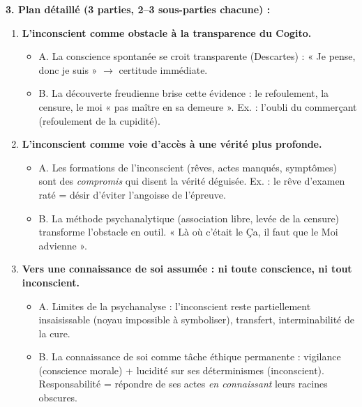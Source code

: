 \documentclass[11pt]{article}
\begin{document}
\begin{exoresolu}
\textbf{3. Plan détaillé (3 parties, 2--3 sous-parties chacune) :}
\begin{enumerate}
    \item \textbf{L'inconscient comme obstacle à la transparence du Cogito.}
    \begin{itemize}
        \item A. La conscience spontanée se croit transparente (Descartes) : « Je pense, donc je suis » $\to$ certitude immédiate.
        \item B. La découverte freudienne brise cette évidence : le refoulement, la censure, le moi « pas maître en sa demeure ». Ex. : l'oubli du commerçant (refoulement de la cupidité).
    \end{itemize}
    \item \textbf{L'inconscient comme voie d'accès à une vérité plus profonde.}
    \begin{itemize}
        \item A. Les formations de l'inconscient (rêves, actes manqués, symptômes) sont des \emph{compromis} qui disent la vérité déguisée. Ex. : le rêve d'examen raté = désir d'éviter l'angoisse de l'épreuve.
        \item B. La méthode psychanalytique (association libre, levée de la censure) transforme l'obstacle en outil. « Là où c'était le Ça, il faut que le Moi advienne ».
    \end{itemize}
    \item \textbf{Vers une connaissance de soi assumée : ni toute conscience, ni tout inconscient.}
    \begin{itemize}
        \item A. Limites de la psychanalyse : l'inconscient reste partiellement insaisissable (noyau impossible à symboliser), transfert, interminabilité de la cure.
        \item B. La connaissance de soi comme tâche éthique permanente : vigilance (conscience morale) + lucidité sur ses déterminismes (inconscient). Responsabilité = répondre de ses actes \emph{en connaissant} leurs racines obscures.
    \end{itemize}
\end{enumerate}


\end{exoresolu}
\end{document}
